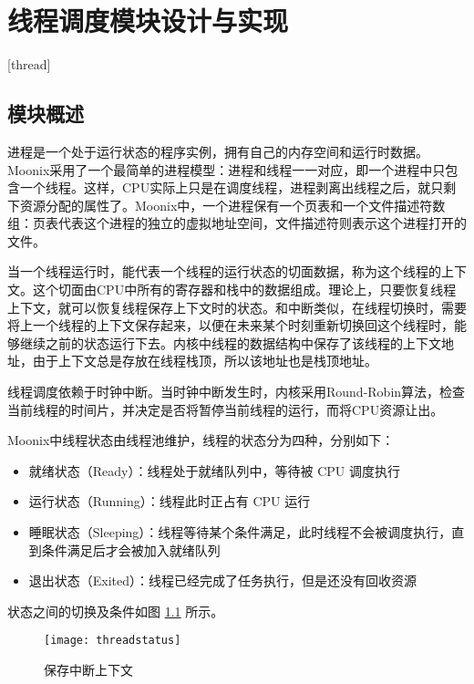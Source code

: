 
\chapter{线程调度模块设计与实现}[thread]
\label{chapter:thread}

\section{模块概述}

进程是一个处于运行状态的程序实例，拥有自己的内存空间和运行时数据。Moonix采用了一个最简单的进程模型：进程和线程一一对应，即一个进程中只包含一个线程。这样，CPU实际上只是在调度线程，进程剥离出线程之后，就只剩下资源分配的属性了。Moonix中，一个进程保有一个页表和一个文件描述符数组：页表代表这个进程的独立的虚拟地址空间，文件描述符则表示这个进程打开的文件。

当一个线程运行时，能代表一个线程的运行状态的切面数据，称为这个线程的上下文。这个切面由CPU中所有的寄存器和栈中的数据组成。理论上，只要恢复线程上下文，就可以恢复线程保存上下文时的状态。和中断类似，在线程切换时，需要将上一个线程的上下文保存起来，以便在未来某个时刻重新切换回这个线程时，能够继续之前的状态运行下去。内核中线程的数据结构中保存了该线程的上下文地址，由于上下文总是存放在线程栈顶，所以该地址也是栈顶地址。

线程调度依赖于时钟中断。当时钟中断发生时，内核采用Round-Robin算法\cite{DBLP:journals/eor/RasmussenT08}，检查当前线程的时间片，并决定是否将暂停当前线程的运行，而将CPU资源让出。

Moonix中线程状态由线程池维护，线程的状态分为四种，分别如下：

\begin{itemize}
	\item 就绪状态（Ready）：线程处于就绪队列中，等待被 CPU 调度执行
	\item 运行状态（Running）：线程此时正占有 CPU 运行
	\item 睡眠状态（Sleeping）：线程等待某个条件满足，此时线程不会被调度执行，直到条件满足后才会被加入就绪队列
	\item 退出状态（Exited）：线程已经完成了任务执行，但是还没有回收资源
\end{itemize}

状态之间的切换及条件如图 \ref{pic:threadstatus} 所示。

\begin{figure}[htpb]
	\centering
	\texttt{[image: threadstatus]}
	\setlength{\abovecaptionskip}{2pt}
	\caption{保存中断上下文}
	\label{pic:threadstatus}
\end{figure}


